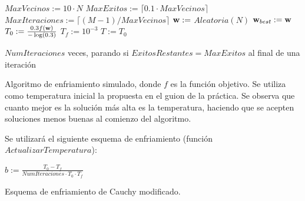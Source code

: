 \documentclass{article}
\newenvironment{algo}{
	\vspace*{0.5cm}
	\begin{algorithm}[H]}{
	\end{algorithm}
	\vspace*{0.5cm}
}
\begin{document}
\begin{algo}
	\BlankLine\BlankLine

	$MaxVecinos := 10 \cdot N$
	$MaxExitos := \lceil 0.1 \cdot MaxVecinos \rceil$
	$MaxIteraciones := \lceil (M-1)/MaxVecinos \rceil$\;
	\BlankLine
	$\normalfont \textbf w :=$ \hyperref[random]{$Aleatoria$}$(N)$
	$\normalfont \textbf w_{best} := \normalfont \textbf w$
	$T_0 := \frac{0.3 f(\textbf w)}{-\log(0.3)}$\;
	$T_f := 10^{-3}$\;
	$T := T_0$\;

	 $NumIteraciones$ veces, parando si $ExitosRestantes = MaxExitos$ al final de una iteración \;
	\vspace{0.2cm}
	\caption{Algoritmo de enfriamiento simulado, donde $f$ es la función objetivo. Se utiliza como temperatura inicial la propuesta en el guion de la práctica. Se observa que cuanto mejor es la solución más alta es la temperatura, haciendo que se acepten soluciones menos buenas al comienzo del algoritmo.}
\end{algo}

\newpage
Se utilizará el siguiente esquema de enfriamiento (función $ActualizarTemperatura$):

\begin{algo}
	\BlankLine
	$\displaystyle b := \frac{T_0 - T_f}{NumIteraciones \cdot T_0 \cdot T_f}$\;
	\vspace{0.2cm}
	\caption{Esquema de enfriamiento de Cauchy modificado.}
\end{algo}
\end{document}
